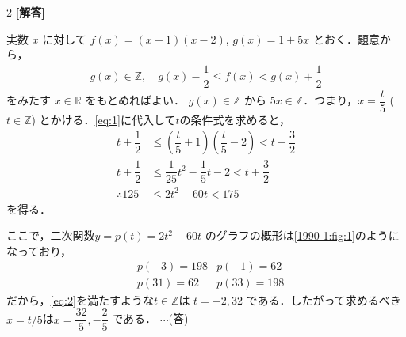 \documentclass[../../main.tex]{subfiles}
\begin{document}
\setcounter{equation}{0}
\setcounter{figure}{0}
\setcounter{table}{0}
\begin{oframed}
  
\end{oframed}
\setlength{\columnseprule}{0.4pt}
\begin{multicols}{2}
  {\bf [解答]}

  実数 $x$ に対して $f(x) = (x+1)(x-2)$, $g(x) = 1+5x$ とおく．題意から，
  \begin{align}\label{eq:1}
    g(x) \in \mathbb{Z}, \quad g(x) - \dfrac{1}{2} \le f(x) < g(x) + \dfrac{1}{2}
  \end{align}
  をみたす $x \in \mathbb{R}$ をもとめればよい．
  $g(x) \in \mathbb{Z}$ から $5x \in \mathbb{Z}$．つまり，$x = \dfrac{t}{5}$ ($t \in \mathbb{Z}$)
  とかける．\cref{eq:1}に代入して$t$の条件式を求めると，
  \begin{align}
    t + \dfrac{1}{2} & \le \left(\dfrac{t}{5}+1\right)\left(\dfrac{t}{5}-2\right) < t+\dfrac{3}{2} \nonumber \\
    t + \dfrac{1}{2} & \le \dfrac{1}{25}t^2  - \dfrac{1}{5}t - 2 < t+\dfrac{3}{2} \nonumber      \\
    \therefore 125  & \le 2t^2 - 60t < 175 \label{eq:2}
  \end{align}
  を得る．

  ここで，二次関数$y = p(t) = 2t^2 - 60t$ のグラフの概形は\cref{1990-1:fig:1}のようになっており，
  \begin{align}
    & p(-3) = 198 & p(-1) = 62  \\
    & p(31) = 62  & p(33) = 198
  \end{align}
  だから，\cref{eq:2}を満たすような$t \in \mathbb{Z}$は $t=-2, 32$ である．したがって求めるべき$x=t/5$は$x = \dfrac{32}{5}, -\dfrac{2}{5}$ である． $\cdots$(答)

  \begin{figure}[H]
    \centering
    \def\yBoundaryLower{125}
    \def\yBoundaryUpper{175}
    \def\yAtIntPoints{128} %




\end{figure}
\end{multicols}
\end{document}
